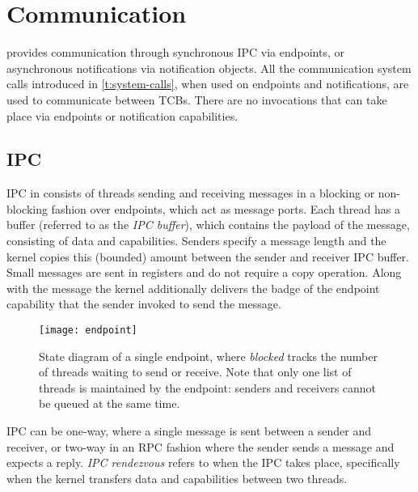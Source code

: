\section{Communication}

\selfour provides communication through synchronous IPC via endpoints, or asynchronous notifications
via notification objects. All the communication system calls introduced in \cref{t:system-calls},
when used on endpoints and notifications, are used to communicate between TCBs. There are no
invocations that can take place via endpoints or notification capabilities. 

\subsection{IPC}
\label{p:sel4_ipc}

IPC in \selfour consists of threads sending and receiving messages in a blocking or non-blocking
fashion over endpoints, which act as
message ports. Each thread has a buffer (referred to as the \emph{IPC buffer}), which contains the payload of the message, consisting
of data and capabilities. Senders specify a message length and the kernel copies this (bounded)
amount between the sender and receiver IPC buffer. Small messages are sent in registers and do not
require a copy operation. 
Along with the message the kernel additionally delivers the badge of the endpoint capability that the sender 
invoked to send the message.

\begin{figure}[t]
    \centering
    \texttt{[image: endpoint]}
    \caption{State diagram of a single endpoint, where \emph{blocked} tracks the number of threads
    waiting to send or receive. Note that only one list of threads is maintained by the endpoint:
senders and receivers cannot be queued at the same time.}
    \label{f:endpoint}
\end{figure}


IPC can be one-way, where a single message is sent between a sender and receiver, or two-way in an
RPC fashion where the sender sends a message and expects a reply. \emph{IPC rendezvous} refers to
when the IPC takes place, specifically when the kernel transfers data and capabilities between two
threads. 

